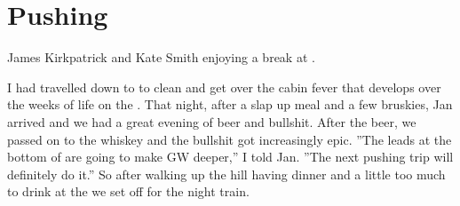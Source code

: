 \section{Pushing
}

    \begin{marginfigure}
\checkoddpage \ifoddpage \forcerectofloat \else \forceversofloat \fi
\centering
 \caption{James Kirkpatrick and Kate Smith enjoying a break at . }
 \label{quilt kal}
\end{marginfigure}

I had travelled down to  to clean and get over the cabin fever that
develops over the weeks of life on the . That night, after a slap
up meal and a few bruskies, Jan arrived and we had a great evening of
beer and bullshit. After the beer, we passed on to the whiskey and the
bullshit got increasingly epic. ''The leads at the bottom of  are going to make GW deeper,'' I told Jan. ''The next pushing trip
will definitely do it.'' So after walking up the hill having dinner and
a little too much to drink at the  we set off for the night train.

